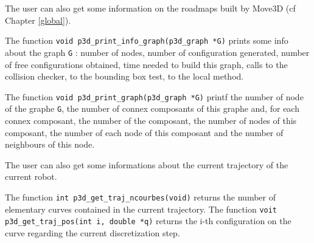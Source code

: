 The user can also get some information on the roadmaps built by Move3D (cf Chapter
\ref{global}). 

The function {\tt void p3d\_print\_info\_graph(p3d\_graph *G)}
 prints
some info about the graph {\tt G} : number of nodes, number of
configuration generated, number of free configurations obtained, time
needed to build this graph, calls to the collision checker, to the
bounding box test, to the local method.

The function {\tt void p3d\_print\_graph(p3d\_graph *G)}
 printf the
number of node of the graphe {\tt G}, the number of connex composants
of this graphe and, for each connex composant, the number of the
composant, the number of nodes of this composant, the number of each node of this
composant and the number of neighbours of this node.

The user can also get some informations about the current  trajectory
of the current robot.

The function {\tt int p3d\_get\_traj\_ncourbes(void)}
 returns the
number of elementary curves contained in the current trajectory.
The function {\tt voit p3d\_get\_traj\_pos(int i, double *q)}
 returns the i-th configuration on the
curve regarding the current discretization step.


